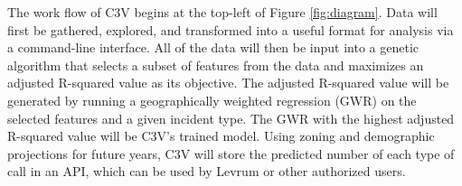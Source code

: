 \documentclass[onecolumn, draftclsnofoot,10pt, compsoc]{IEEEtran}
\begin{document}
    The work flow of C3V begins at the top-left of Figure \ref{fig:diagram}.
    Data will first be gathered, explored, and transformed into a useful format for analysis via a command-line interface. 
    All of the data will then be input into a genetic algorithm that selects a subset of features from the data and maximizes an adjusted R-squared value as its objective.
    The adjusted R-squared value will be generated by running a geographically weighted regression (GWR) on the selected features and a given incident type.
    The GWR with the highest adjusted R-squared value will be C3V's trained model.
    Using zoning and demographic projections for future years, C3V will store the predicted number of each type of call in an API, which can be used by Levrum or other authorized users. 
    
\end{document}
